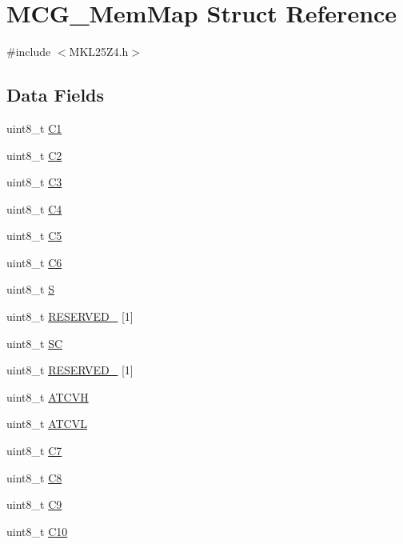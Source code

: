 \hypertarget{struct_m_c_g___mem_map}{}\section{M\+C\+G\+\_\+\+Mem\+Map Struct Reference}
\label{struct_m_c_g___mem_map}


{\ttfamily \#include $<$M\+K\+L25\+Z4.\+h$>$}

\subsection*{Data Fields}
\begin{DoxyCompactItemize}
\item 
uint8\+\_\+t \hyperlink{struct_m_c_g___mem_map_a8286c9d870f31a089d95e6a2285fbe2f}{C1}
\item 
uint8\+\_\+t \hyperlink{struct_m_c_g___mem_map_acdf8ac8ab339152eaed13f4eca300aa5}{C2}
\item 
uint8\+\_\+t \hyperlink{struct_m_c_g___mem_map_a328e95cb4deb2dd724cb8b26a5ab381b}{C3}
\item 
uint8\+\_\+t \hyperlink{struct_m_c_g___mem_map_a9ecb3242c606bc219190b4cb4f64600f}{C4}
\item 
uint8\+\_\+t \hyperlink{struct_m_c_g___mem_map_ac0242981a4c4bd9ccd00b67970943978}{C5}
\item 
uint8\+\_\+t \hyperlink{struct_m_c_g___mem_map_a64bf696a1420e91b19a0fc0b29311e5b}{C6}
\item 
uint8\+\_\+t \hyperlink{struct_m_c_g___mem_map_aef44b210af6af7cb40efdfd5469406c0}{S}
\item 
uint8\+\_\+t \hyperlink{struct_m_c_g___mem_map_a4be6979b69000068ac5203085d425825}{R\+E\+S\+E\+R\+V\+E\+D\+\_} \mbox{[}1\mbox{]}
\item 
uint8\+\_\+t \hyperlink{struct_m_c_g___mem_map_a994283cb179a11ded2d18c30c3710802}{SC}
\item 
uint8\+\_\+t \hyperlink{struct_m_c_g___mem_map_a83b2d6f5756a9b0aa609216190380d5f}{R\+E\+S\+E\+R\+V\+E\+D\+\_} \mbox{[}1\mbox{]}
\item 
uint8\+\_\+t \hyperlink{struct_m_c_g___mem_map_a7ae9332fda80dd2a8e8f6bbe7402f04e}{A\+T\+C\+VH}
\item 
uint8\+\_\+t \hyperlink{struct_m_c_g___mem_map_ae14380e7296a15f9cad9168b69189eff}{A\+T\+C\+VL}
\item 
uint8\+\_\+t \hyperlink{struct_m_c_g___mem_map_af43b800cd7ef121b64ecb21279141911}{C7}
\item 
uint8\+\_\+t \hyperlink{struct_m_c_g___mem_map_a3b00df5dfe47159247af492db046dd07}{C8}
\item 
uint8\+\_\+t \hyperlink{struct_m_c_g___mem_map_afcf64e260d0ed62eb0141dee036d0dd3}{C9}
\item 
uint8\+\_\+t \hyperlink{struct_m_c_g___mem_map_aeaf517a97bec32fa35a10e97fdff08be}{C10}
\end{DoxyCompactItemize}


